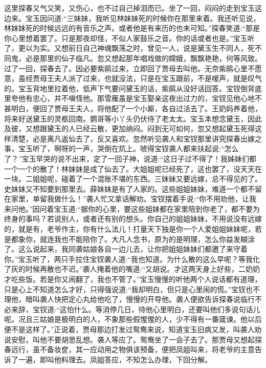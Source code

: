 \begin{parag}
    这里探春又气又笑，又伤心，也不过自己掉泪而已。坐了一回，闷闷的走到宝玉这边来。宝玉因问道:“三妹妹，我听见林妹妹死的时候你在那里来着。我还听见说，林妹妹死的时候远远的有音乐之声。或者他是有来历的也未可知。”探春笑道:“那是你心里想着罢了。只是那夜却怪，不似人家鼓乐之音。你的话或者也是。”宝玉听了，更以为实。又想前日自己神魂飘荡之时，曾见一人，说是黛玉生不同人，死不同鬼，必是那里的仙子临凡。忽又想起那年唱戏做的嫦娥，飘飘艳艳，何等风致。过了一回，探春去了。因必要紫鹃过来，立即回了贾母去叫他。无奈紫鹃心里不愿意，虽经贾母王夫人派了过来，也就没法，只是在宝玉跟前，不是嗳声，就是叹气的。宝玉背地里拉着他，低声下气要问黛玉的话，紫鹃从没好话回答。宝钗倒背底里夸他有忠心，并不嗔怪他。那雪雁虽是宝玉娶亲这夜出过力的，宝钗见他心地不甚明白，便回了贾母王夫人，将他配了一个小厮，各自过活去了。王奶妈养着他，将来好送黛玉的灵柩回南。鹦哥等小丫头仍伏侍了老太太。宝玉本想念黛玉，因此及彼，又想跟黛玉的人已经云散，更加纳闷。闷到无可如何，忽又想起黛玉死得这样清楚，必是离凡返仙去了，反又喜欢。忽然听见袭人和宝钗那里讲究探春出嫁之事，宝玉听了，啊呀的一声，哭倒在炕上。唬得宝钗袭人都来扶起说:“怎么了？”宝玉早哭的说不出来，定了一回子神，说道:“这日子过不得了！我姊妹们都一个一个的散了！林妹妹是成了仙去了。大姐姐呢已经死了，这也罢了，没天天在一块。二姐姐呢，碰着了一个混账不堪的东西。三妹妹又要远嫁，总不得见的了。史妹妹又不知要到那里去。薛妹妹是有了人家的。这些姐姐妹妹，难道一个都不留在家里，单留我做什么！”袭人忙又拿话解劝。宝钗摆着手说:“你不用劝他，让我来问他。”因问着宝玉道:“据你的心里，要这些姐妹都在家里陪到你老了，都不要为终身的事吗？若说别人，或者还有别的想头。你自己的姐姐妹妹，不用说没有远嫁的，就是有，老爷作主，你有什么法儿！打量天下独是你一个人爱姐姐妹妹呢，若是都象你，就连我也不能陪你了。大凡人念书，原为的是明理，怎么你益发糊涂了。这么说起来，我同袭姑娘各自一边儿去，让你把姐姐妹妹们都邀了来守着你。”宝玉听了，两只手拉住宝钗袭人道:“我也知道。为什么散的这么早呢？等我化了灰的时候再散也不迟。”袭人掩着他的嘴道:“又胡说。才这两天身上好些，二奶奶才吃些饭。若是你又闹翻了，我也不管了。”宝玉慢慢的听他两个人说话都有道理，只是心上不知道怎么才好，只得强说道:“我却明白，但只是心里闹的慌。”宝钗也不理他，暗叫袭人快把定心丸给他吃了，慢慢的开导他。袭人便欲告诉探春说临行不必来辞，宝钗道:“这怕什么。等消停几日，待他心里明白，还要叫他们多说句话儿呢。况且三姑娘是极明白的人，不象那些假惺惺的人，少不得有一番箴谏。他以后便不是这样了。”正说着，贾母那边打发过鸳鸯来说，知道宝玉旧病又发，叫袭人劝说安慰，叫他不要胡思乱想。袭人等应了。鸳鸯坐了一会子去了。那贾母又想起探春远行，虽不备妆奁，其一应动用之物俱该预备，便把凤姐叫来，将老爷的主意告诉了一遍，即叫他料理去。凤姐答应，不知怎么办理，下回分解。
\end{parag}